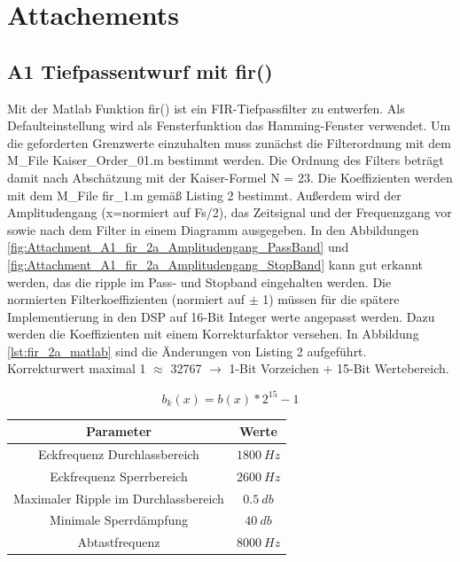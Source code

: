 \section{Attachements}
\subsection{A1 Tiefpassentwurf mit fir()}
\label{cap:A1}
Mit der Matlab Funktion fir() ist ein FIR-Tiefpassfilter zu entwerfen. Als Defaulteinstellung wird als Fensterfunktion das Hamming-Fenster verwendet. Um die geforderten Grenzwerte einzuhalten muss zunächst die Filterordnung mit dem M\_File Kaiser\_Order\_01.m bestimmt werden. Die Ordnung des Filters beträgt damit nach Abschätzung mit der Kaiser-Formel N
= 23. Die Koeffizienten werden mit dem M\_File fir\_1.m gemäß Listing 2 bestimmt. Außerdem wird der Amplitudengang (x=normiert auf Fs/2), das Zeitsignal und der Frequenzgang vor sowie nach dem Filter in einem Diagramm ausgegeben. In den Abbildungen \ref{fig:Attachment_A1_fir_2a_Amplitudengang_PassBand} und \ref{fig:Attachment_A1_fir_2a_Amplitudengang_StopBand} kann gut erkannt werden, das die ripple im Pass- und Stopband eingehalten werden. Die normierten Filterkoeffizienten (normiert auf $\pm$ 1) müssen für die spätere Implementierung in den DSP auf 16-Bit Integer werte angepasst werden. Dazu werden die Koeffizienten mit einem Korrekturfaktor versehen. In Abbildung \ref{lst:fir_2a_matlab} sind die Änderungen von Listing 2 aufgeführt.\\Korrekturwert maximal 1 $\approx$ 32767 $\rightarrow$ 1-Bit Vorzeichen + 15-Bit Wertebereich. 

\begin{equation}
b_{k}(x) = b(x) * 2^{15}-1
\end{equation}

\begin{table}[h]
	\centering
	\begin{tabular}{c | c}
		Parameter	& Werte	\\
		\hline
		Eckfrequenz Durchlassbereich			& $1800~Hz$	\\
		Eckfrequenz Sperrbereich				& $2600~Hz$	\\
		Maximaler Ripple im Durchlassbereich	& $0.5~db$	\\
		Minimale Sperrdämpfung					& $40~db$	\\
		Abtastfrequenz							& $8000~Hz$	\\
	\end{tabular}
\end{table}

